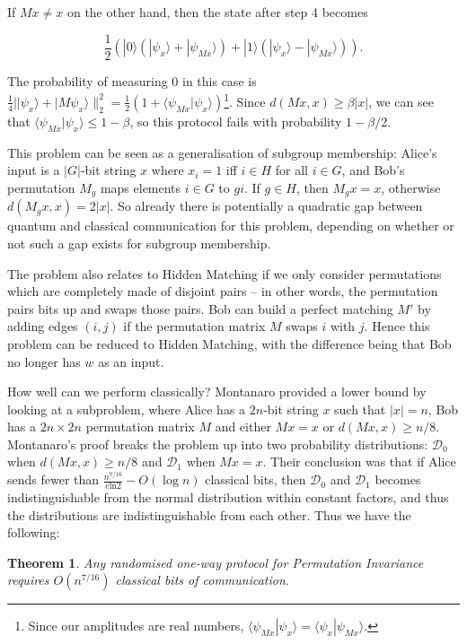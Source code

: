 \documentclass[a4paper]{article}
\newtheorem{theorem}{Theorem}[section]
\begin{document}
\begin{appendices}
        If $Mx \neq x$ on the other hand, then the state after step 4 becomes

        $$\frac{1}{2}(|0\rangle(|\psi_x\rangle + |\psi_{Mx}\rangle) + |1\rangle(|\psi_x\rangle - |\psi_{Mx}\rangle)).$$

        The probability of measuring $0$ in this case is $\frac{1}{4}||\psi_x\rangle + |M\psi_x\rangle\|_2^2 = \frac{1}{2}(1 + \langle\psi_{Mx}|\psi_x\rangle)$\footnote{Since our amplitudes are real numbers, $\langle\psi_{Mx}|\psi_x\rangle = \langle\psi_x|\psi_{Mx}\rangle$.}. Since $d(Mx, x) \geq \beta|x|$, we can see that $\langle\psi_{Mx}|\psi_x\rangle \leq 1 - \beta$, so this protocol fails with probability $1 - \beta/2$.

        This problem can be seen as a generalisation of subgroup membership: Alice's input is a $|G|$-bit string $x$ where $x_i = 1$ iff $i \in H$ for all $i \in G$, and Bob's permutation $M_g$ maps elements $i \in G$ to $gi$. If $g \in H$, then $M_gx = x$, otherwise $d(M_gx, x) = 2|x|$. So already there is potentially a quadratic gap between quantum and classical communication for this problem, depending on whether or not such a gap exists for subgroup membership.

        The problem also relates to Hidden Matching if we only consider permutations which are completely made of disjoint pairs -- in other words, the permutation pairs bits up and swaps those pairs. Bob can build a perfect matching $M'$ by adding edges $(i, j)$ if the permutation matrix $M$ swaps $i$ with $j$. Hence this problem can be reduced to Hidden Matching, with the difference being that Bob no longer has $w$ as an input.

        How well can we perform classically? Montanaro \cite{Montanaro:2011:NES:2230916.2230919} provided a lower bound by looking at a subproblem, where Alice has a $2n$-bit string $x$ such that $|x| = n$, Bob has a $2n \times 2n$ permutation matrix $M$ and either $Mx = x$ or $d(Mx, x) \geq n/8$. Montanaro's proof breaks the problem up into two probability distributions: $\mathcal{D}_0$ when $d(Mx, x) \geq n/8$ and $\mathcal{D}_1$ when $Mx = x$. Their conclusion was that if Alice sends fewer than $\frac{n^{7/16}}{e\textrm{ln}2} - O(\log n)$ classical bits, then $\mathcal{D}_0$ and $\mathcal{D}_1$ becomes indistinguishable from the normal distribution within constant factors, and thus the distributions are indistinguishable from each other. Thus we have the following:

        \begin{theorem}
            Any randomised one-way protocol for Permutation Invariance requires $O(n^{7/16})$ classical bits of communication.
        \end{theorem}


\end{appendices}
\end{document}
